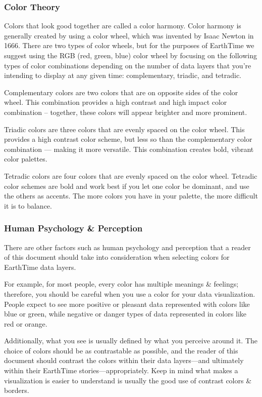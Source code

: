 \documentclass[
  12pt,
]{krantz}
\begin{document}
\hypertarget{color-theory}{%
\subsubsection*{Color Theory}\label{color-theory}}


Colors that look good together are called a color harmony. Color harmony is generally created by using a color wheel, which was invented by Isaac Newton in 1666. There are two types of color wheels, but for the purposes of EarthTime we suggest using the RGB (red, green, blue) color wheel by focusing on the following types of color combinations depending on the number of data layers that you're intending to display at any given time: complementary, triadic, and tetradic.

Complementary colors are two colors that are on opposite sides of the color wheel. This combination provides a high contrast and high impact color combination -- together, these colors will appear brighter and more prominent.

Triadic colors are three colors that are evenly spaced on the color wheel. This provides a high contrast color scheme, but less so than the complementary color combination --- making it more versatile. This combination creates bold, vibrant color palettes.

Tetradic colors are four colors that are evenly spaced on the color wheel. Tetradic color schemes are bold and work best if you let one color be dominant, and use the others as accents. The more colors you have in your palette, the more difficult it is to balance.

\hypertarget{human-psychology-perception}{%
\subsubsection*{Human Psychology \& Perception}\label{human-psychology-perception}}


There are other factors such as human psychology and perception that a reader of this document should take into consideration when selecting colors for EarthTime data layers.

For example, for most people, every color has multiple meanings \& feelings; therefore, you should be careful when you use a color for your data visualization. People expect to see more positive or pleasant data represented with colors like blue or green, while negative or danger types of data represented in colors like red or orange.

Additionally, what you see is usually defined by what you perceive around it. The choice of colors should be as contrastable as possible, and the reader of this document should contrast the colors within their data layers---and ultimately within their EarthTime stories---appropriately. Keep in mind what makes a visualization is easier to understand is usually the good use of contrast colors \& borders.
\end{document}
